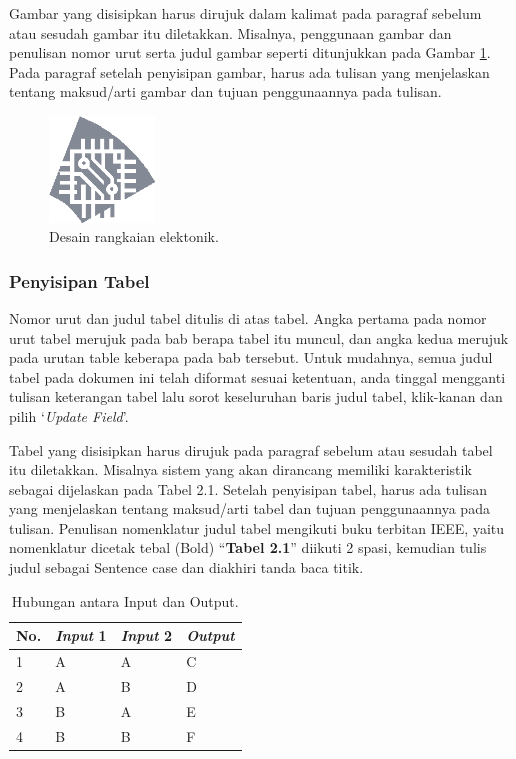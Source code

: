 \documentclass{final_project}
\begin{document}
Gambar yang disisipkan harus dirujuk dalam kalimat pada paragraf sebelum atau sesudah gambar itu diletakkan. Misalnya, penggunaan gambar dan penulisan nomor urut serta judul gambar seperti ditunjukkan pada Gambar \ref{fig:1}. Pada paragraf setelah penyisipan gambar, harus ada tulisan yang menjelaskan tentang maksud/arti gambar dan tujuan penggunaannya pada tulisan.

\begin{figure}[!ht]
    \centering
    \includegraphics[width=0.25\textwidth]{examplefig.png}
    \caption{Desain rangkaian elektonik.}
    \label{fig:1}
\end{figure}

\subsubsection{Penyisipan Tabel}

Nomor urut dan judul tabel ditulis di atas tabel. Angka pertama pada nomor urut tabel merujuk pada bab berapa tabel itu muncul, dan angka kedua merujuk pada urutan table keberapa pada bab tersebut. Untuk mudahnya, semua judul tabel pada dokumen ini telah diformat sesuai ketentuan, anda tinggal mengganti tulisan keterangan tabel lalu sorot keseluruhan baris judul tabel, klik-kanan dan pilih ‘\textit{Update Field}’.

Tabel yang disisipkan harus dirujuk pada paragraf sebelum atau sesudah tabel itu diletakkan. Misalnya sistem yang akan dirancang memiliki karakteristik sebagai dijelaskan pada Tabel 2.1. Setelah penyisipan tabel, harus ada tulisan yang menjelaskan tentang maksud/arti tabel dan tujuan penggunaannya pada tulisan. Penulisan nomenklatur judul tabel mengikuti buku terbitan IEEE, yaitu nomenklatur dicetak tebal (Bold) “\textbf{Tabel 2.1}” diikuti 2 spasi, kemudian tulis judul sebagai Sentence case dan diakhiri tanda baca titik.

\begin{table}[!ht]
\centering
\caption{Hubungan antara Input dan Output.}
\begin{tabular}{|p{10mm}|p{15mm}|p{15mm}|p{15mm}|} 
 \hline
 \rowcolor{lightgray}
 \textbf{No.} & \textbf{\textit{Input} 1} & \textbf{\textit{Input} 2} & \textbf{\textit{Output}} \\
 \hline
 1 & A & A & C \\ 
 \hline
 2 & A & B & D \\
 \hline
 3 & B & A & E \\
 \hline
 4 & B & B & F \\
 \hline
\end{tabular}
\label{table:2}
\end{table}
\end{document}
